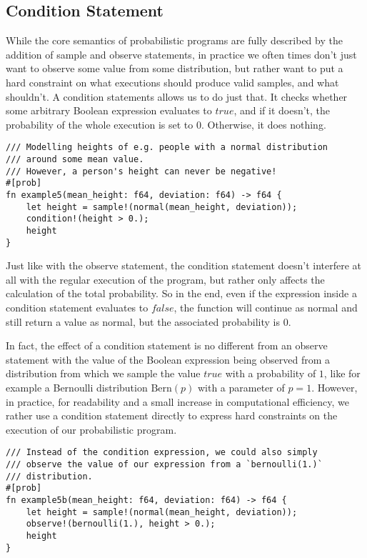 \subsection{Condition Statement}

While the core semantics of probabilistic programs are fully described by the addition of sample and observe statements, in practice we often times don't just want to observe some value from some distribution, but rather want to put a hard constraint on what executions should produce valid samples, and what shouldn't. A condition statements allows us to do just that. It checks whether some arbitrary Boolean expression evaluates to $true$, and if it doesn't, the probability of the whole execution is set to $0$. Otherwise, it does nothing.

\begin{minipage}{\linewidth}
\begin{lstlisting}
/// Modelling heights of e.g. people with a normal distribution
/// around some mean value.
/// However, a person's height can never be negative!
#[prob]
fn example5(mean_height: f64, deviation: f64) -> f64 {
    let height = sample!(normal(mean_height, deviation));
    condition!(height > 0.);
    height
}
\end{lstlisting}
\end{minipage}

Just like with the observe statement, the condition statement doesn't interfere at all with the regular execution of the program, but rather only affects the calculation of the total probability. So in the end, even if the expression inside a condition statement evaluates to $false$, the function will continue as normal and still return a value as normal, but the associated probability is $0$.

In fact, the effect of a condition statement is no different from an observe statement with the value of the Boolean expression being observed from a distribution from which we sample the value $true$ with a probability of $1$, like for example a Bernoulli distribution $\text{Bern}(p)$ with a parameter of $p=1$. However, in practice, for readability and a small increase in computational efficiency, we rather use a condition statement directly to express hard constraints on the execution of our probabilistic program.

\begin{minipage}{\linewidth}
\begin{lstlisting}
/// Instead of the condition expression, we could also simply
/// observe the value of our expression from a `bernoulli(1.)`
/// distribution.
#[prob]
fn example5b(mean_height: f64, deviation: f64) -> f64 {
    let height = sample!(normal(mean_height, deviation));
    observe!(bernoulli(1.), height > 0.);
    height
}
\end{lstlisting}
\end{minipage}

